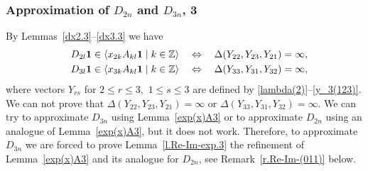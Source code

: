 \documentclass[preprint,12pt]{elsarticle}
\numberwithin{equation}{section}
\begin{document}
\subsubsection{Approximation of $D_{2n}$ and $D_{3n}$, 3}
\label{s.446}
By Lemmas~\ref{dx2.3}--\ref{dx3.3} we have 
\begin{eqnarray*}
&& 
D_{2l}{\bf 1}\in\langle x_{2k}A_{kl}{\bf 1}\mid k\in {\mathbb Z}\rangle
\quad\Leftrightarrow\quad 
%
\Delta(Y_{22},Y_{23},Y_{21})=\infty,\\
&&
D_{3l}{\bf 1}\in\langle x_{3k}A_{kl}{\bf 1}\mid k\in {\mathbb Z}\rangle
\quad\Leftrightarrow\quad 
\Delta(Y_{33},Y_{31},Y_{32})=\infty,
\end{eqnarray*}
where vectors $Y_{rs}$ for $2\leq r\leq3,\,\, 1\leq s\leq 3 $ are defined by \eqref{lambda(2)}--\eqref{y_3(123)}.
We can not prove that $ \Delta(Y_{22},Y_{23},Y_{21})=\infty$ or $\Delta(Y_{33},Y_{31},Y_{32})=\infty$.
We can try to approximate $D_{3n}$  using Lemma~\ref{exp(x)A3}  or
to approximate $D_{2n}$ using an analogue of Lemma~\ref{exp(x)A3}, but it does not work.
Therefore, to approximate  $D_{3n}$ we are forced to prove Lemma~\ref{l.Re-Im-exp.3} the refinement of Lemma~\ref{exp(x)A3} and its analogue for $D_{2n}$, see Remark~\ref{r.Re-Im-(011)} below.
\end{document}
